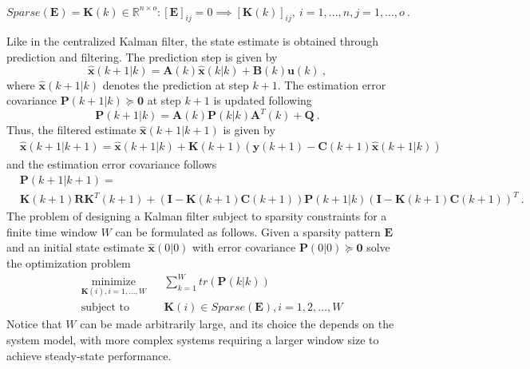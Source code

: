 \begin{equation*} 
      Sparse(\boldsymbol{E})=
        {\boldsymbol{K}(k) \in \mathbb{R}^{{n}\times{o}}: [\boldsymbol{E}]_{ij}=0 \implies [\boldsymbol{K}(k)]_{ij}, \ i=1,...,n, j=1,...,o} \ .
\end{equation*}
\par
Like in the centralized Kalman filter, the state estimate is obtained through prediction and filtering. The prediction step is given by
\begin{equation} \label{eq:3.6}
    \boldsymbol{\hat{x}}(k+1|k)=\boldsymbol{A}(k)\boldsymbol{\hat{x}}(k|k)+\boldsymbol{B}(k)\boldsymbol{u}(k) \ ,
\end{equation}
where $\boldsymbol{\hat{x}}(k+1|k)$ denotes the prediction at step $k+1$.
The estimation error covariance $\boldsymbol{P}(k+1|k) \succeq \boldsymbol{0}$ at step $k+1$ is updated following
\begin{equation} \label{eq:3.7}
    \boldsymbol{P}(k+1|k)=\boldsymbol{A}(k)\boldsymbol{P}(k|k)\boldsymbol{A}^T(k)+\boldsymbol{Q} \ .
\end{equation}
Thus, the filtered estimate $\boldsymbol{\hat{x}}(k+1|k+1)$ is given by
\begin{equation} \label{eq:3.8}
\begin{split}
    &\boldsymbol{\hat{x}}(k+1|k+1)=
    \boldsymbol{\hat{x}}(k+1|k)+\boldsymbol{K}(k+1)(\boldsymbol{y}(k+1)-\boldsymbol{C}(k+1)\boldsymbol{\hat{x}}(k+1|k))
\end{split}
\end{equation}
and the estimation error covariance follows
\begin{equation} \label{eq:3.9}
\begin{split}
    &\boldsymbol{P}(k+1|k+1)=\\
    &\boldsymbol{K}(k+1)\boldsymbol{R}\boldsymbol{K}^T(k+1)+(\boldsymbol{I}-\boldsymbol{K}(k+1)\boldsymbol{C}(k+1))
    \boldsymbol{P}(k+1|k)(\boldsymbol{I}-\boldsymbol{K}(k+1)\boldsymbol{C}(k+1))^T \ .
\end{split}
\end{equation}
The problem of designing a Kalman filter subject to sparsity constraints for a finite time window $W$ can be formulated as follows. Given a sparsity pattern $\boldsymbol{E}$ and an initial state estimate $\boldsymbol{\hat{x}}(0|0)$ with error covariance $\boldsymbol{P}(0|0) \succeq \boldsymbol{0}$ solve the optimization problem
\begin{equation} \label{eq:1.10}
\begin{aligned}
& \underset{\boldsymbol{K}(i),i=1,...,W}{\text{minimize}}
& & \sum_{k=1}^{W}tr(\boldsymbol{P}(k|k)) \\
& \text{subject to}
& & \boldsymbol{K}(i) \in Sparse(\boldsymbol{E}), i=1,2, \dots, W
\end{aligned}
\end{equation}
Notice that $W$ can be made arbitrarily large, and its choice the depends on the system model, with more complex systems requiring a larger window size to achieve steady-state performance.
